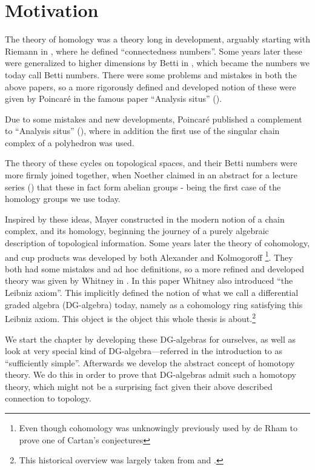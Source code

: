 
\section{Motivation}

The theory of homology was a theory long in development, arguably starting with Riemann in \cite{riemann}, where he defined ``connectedness numbers''. Some years later these were generalized to higher dimensions by Betti in \cite{betti}, which became the numbers we today call Betti numbers. There were some problems and mistakes in both the above papers, so a more rigorously defined and developed notion of these were given by Poincaré in the famous paper ``Analysis situs'' (\cite{situs}). 

Due to some mistakes and new developments, Poincaré published a complement to ``Analysis situs'' (\cite{situs2}), where in addition the first use of the singular chain complex of a polyhedron was used. 

The theory of these cycles on topological spaces, and their Betti numbers were more firmly joined together, when Noether claimed in an abstract for a lecture series (\cite{noether}) that these in fact form abelian groups - being the first case of the homology groups we use today. 

Inspired by these ideas, Mayer constructed in \cite{mayer, mayer2} the modern notion of a chain complex, and its homology, beginning the journey of a purely algebraic description of topological information. Some years later the theory of cohomology, and cup products was developed by both Alexander and Kolmogoroff \footnote{Even though cohomology was unknowingly previously used by de Rham to prove one of Cartan's conjectures}. They both had some mistakes and ad hoc definitions, so a more refined and developed theory was given by Whitney in \cite{whitney}. In this paper Whitney also introduced ``the Leibniz axiom''. This implicitly defined the notion of what we call a differential graded algebra (DG-algebra) today, namely as a cohomology ring satisfying this Leibniz axiom. This object is the object this whole thesis is about.\footnote{This historical overview was largely taken from \cite{history1} and \cite{history2}.}

We start the chapter by developing these DG-algebras for ourselves, as well as look at very special kind of DG-algebra---referred in the introduction to as ``sufficiently simple''. Afterwards we develop the abstract concept of homotopy theory. We do this in order to prove that DG-algebras admit such a homotopy theory, which might not be a surprising fact given their above described connection to topology. 


